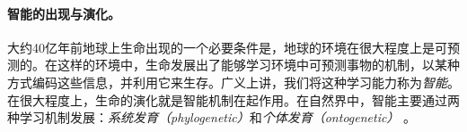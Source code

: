 \documentclass[../../book-main.tex]{subfiles}
\begin{document}
\paragraph{智能的出现与演化。}

大约40亿年前地球上生命出现的一个必要条件是，地球的环境在很大程度上是可预测的。在这样的环境中，生命发展出了能够学习环境中可预测事物的机制，以某种方式编码这些信息，并利用它来生存。广义上讲，我们将这种学习能力称为{\em 智能}。在很大程度上，生命的演化就是智能机制在起作用。在自然界中，智能主要通过两种学习机制发展：{\em 系统发育（phylogenetic）}和{\em 个体发育（ontogenetic）} \cite{Wiener-Cybernetics-1961}。%
\end{document}
